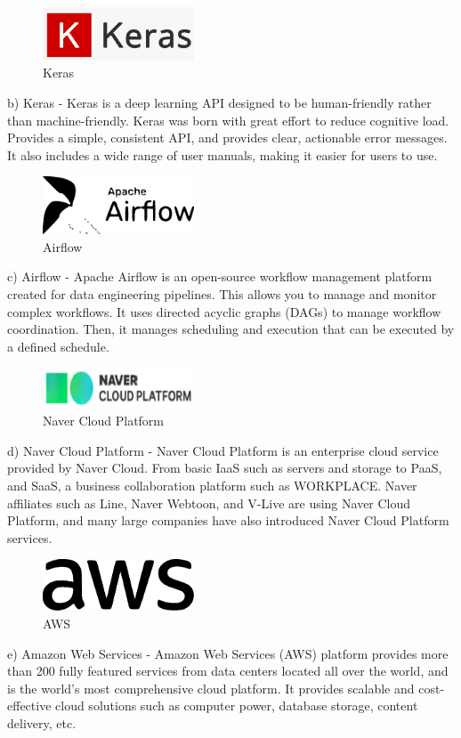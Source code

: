 \documentclass[conference]{IEEEtran}
\begin{document}
\begin{figure}[!htbp]
\centering
    \includegraphics[width =4.5cm]{pictures/keras}
    \hfil
\caption{Keras}
\end{figure}
b)	Keras
-	Keras is a deep learning API designed to be human-friendly rather than machine-friendly. Keras was born with great effort to reduce cognitive load. Provides a simple, consistent API, and provides clear, actionable error messages. It also includes a wide range of user manuals, making it easier for users to use.
\begin{figure}[!htbp]
\centering
    \includegraphics[width =4.5cm]{pictures/airflow.eps}
    \hfil
\caption{Airflow}
\end{figure}

c)	Airflow
-	Apache Airflow is an open-source workflow management platform created for data engineering pipelines. This allows you to manage and monitor complex workflows. It uses directed acyclic graphs (DAGs) to manage workflow coordination. Then, it manages scheduling and execution that can be executed by a defined schedule.

\begin{figure}[!htbp]
\centering
    \includegraphics[width =4.5cm]{pictures/ncp.eps}
    \hfil
\caption{Naver Cloud Platform}
\end{figure}

d)	Naver Cloud Platform
-	Naver Cloud Platform is an enterprise cloud service provided by Naver Cloud. From basic IaaS such as servers and storage to PaaS, and SaaS, a business collaboration platform such as WORKPLACE. Naver affiliates such as Line, Naver Webtoon, and V-Live are using Naver Cloud Platform, and many large companies have also introduced Naver Cloud Platform services.

\begin{figure}[!htbp]
\centering
    \includegraphics[width =4.5cm]{pictures/AWS.eps}
    \hfil
\caption{AWS}
\end{figure}
e)	Amazon Web Services
-	Amazon Web Services (AWS) platform provides more than 200 fully featured services from data centers located all over the world, and is the world's most comprehensive cloud platform. It provides scalable and cost-effective cloud solutions such as computer power, database storage, content delivery, etc. 
\end{document}
